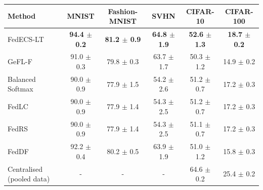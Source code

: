 \begin{tabular}{lccccc}
\toprule
Method & MNIST & Fashion-MNIST & SVHN & CIFAR-10 & CIFAR-100\\
\midrule
FedECS-LT & \textbf{94.4 $\pm$ 0.2} & \textbf{81.2 $\pm$ 0.9} & \textbf{64.8 $\pm$ 1.9} & \textbf{52.6 $\pm$ 1.3} & \textbf{18.7 $\pm$ 0.2}\\
GeFL-F & 91.0 $\pm$ 0.3 & 79.8 $\pm$ 0.3 & 63.7 $\pm$ 1.7 & 50.3 $\pm$ 1.2 & 14.9 $\pm$ 0.2\\
Balanced Softmax & 90.0 $\pm$ 0.9 & 77.9 $\pm$ 1.5 & 54.2 $\pm$ 2.6 & 51.2 $\pm$ 0.7 & 17.2 $\pm$ 0.3\\
FedLC & 90.0 $\pm$ 0.9 & 77.9 $\pm$ 1.4 & 54.3 $\pm$ 2.5 & 51.2 $\pm$ 0.7 & 17.2 $\pm$ 0.3\\
FedRS & 90.0 $\pm$ 0.9 & 77.9 $\pm$ 1.4 & 54.3 $\pm$ 2.5 & 51.1 $\pm$ 0.7 & 17.2 $\pm$ 0.3\\
FedDF & 92.2 $\pm$ 0.4 & 80.2 $\pm$ 0.5 & 63.9 $\pm$ 1.9 & 51.0 $\pm$ 1.2 & 15.8 $\pm$ 0.3\\
Centralised (pooled data) & - & - & - & 64.6 $\pm$ 0.2 & 25.4 $\pm$ 0.2\\
\bottomrule
\end{tabular}
